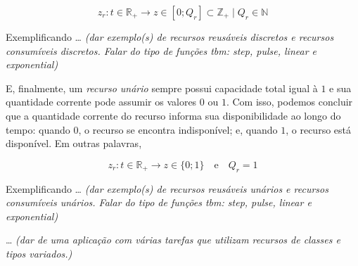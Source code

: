         \begin{equation} \label{eq:recurso_discreto}
            z_r: t \in \mathbb{R}_+ \to z \in [0; Q_r] \subset \mathbb{Z}_+ \mid Q_r \in \mathbb{N}
        \end{equation}
        
        Exemplificando \dots \emph{\color{red} (dar exemplo(s) de recursos reusáveis discretos e recursos consumíveis discretos. Falar do tipo de funções tbm: \textit{step}, \textit{pulse}, \textit{linear} e \textit{exponential})}
        
        E, finalmente, um \textit{recurso unário} sempre possui capacidade total igual à $1$ e sua quantidade corrente pode assumir os valores $0$ ou $1$. Com isso, podemos concluir que a quantidade corrente do recurso informa sua disponibilidade ao longo do tempo: quando $0$, o recurso se encontra indisponível; e, quando $1$, o recurso está disponível. Em outras palavras,
        
        \begin{equation} \label{eq:recurso_unario}
            z_r: t \in \mathbb{R}_+ \to z \in \{0; 1\} 
            \quad\text{e}\quad
            Q_r = 1
        \end{equation}
        
        Exemplificando \dots \emph{\color{red} (dar exemplo(s) de recursos reusáveis unários e recursos consumíveis unários. Falar do tipo de funções tbm: \textit{step}, \textit{pulse}, \textit{linear} e \textit{exponential})}
        
        \dots \emph{\color{red} (dar de uma aplicação com várias tarefas que utilizam recursos de classes e tipos variados.)}
